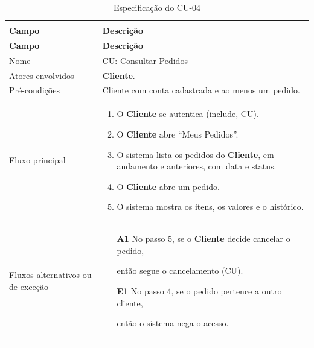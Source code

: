 \documentclass[12pt,a4paper]{article}
\begin{document}
{\setlength{\arrayrulewidth}{0.3pt}\renewcommand{\arraystretch}{1.1}\small{}
\begin{xltabular}{\textwidth}{>{\raggedright\arraybackslash}p{3.4cm}|>{\raggedright\arraybackslash}X}
\caption{Especificação do CU-04}\\
\toprule{}
\textbf{Campo} & \textbf{Descrição}\\ \midrule{}
\endfirsthead
{}\toprule{}
\textbf{Campo} & \textbf{Descrição}\\ \midrule{}
\endhead
\endlastfoot
Nome & CU: Consultar Pedidos\\ \hline
Atores envolvidos & \textbf{Cliente}.\\ \hline
Pré-condições & Cliente com conta cadastrada e ao menos um pedido.\\ \hline
Fluxo principal & \begin{enumerate}[nosep,leftmargin=1.4em,label=\arabic*.,before=\vspace{-\baselineskip},after=\vspace{-0.4\baselineskip}]\item O \textbf{Cliente} se autentica (include, CU). \item O \textbf{Cliente} abre ``Meus Pedidos''. \item O sistema lista os pedidos do \textbf{Cliente}, em andamento e anteriores, com data e status. \item O \textbf{Cliente} abre um pedido. \item O sistema mostra os itens, os valores e o histórico. \end{enumerate}\\ \hline
Fluxos alternativos ou de exceção & \begin{itemize}[nosep,leftmargin=2.2em,labelwidth=2.2em,labelsep=0pt,align=left,itemsep=4pt,before=\vspace{-\baselineskip},after=\vspace{-0.4\baselineskip}]\item[\textbf{A1}] No passo 5, se o \textbf{Cliente} decide cancelar o pedido,\par então segue o cancelamento (CU). \item[\textbf{E1}] No passo 4, se o pedido pertence a outro cliente,\par então o sistema nega o acesso.\end{itemize}\\ \bottomrule
\end{xltabular}}
\end{document}
